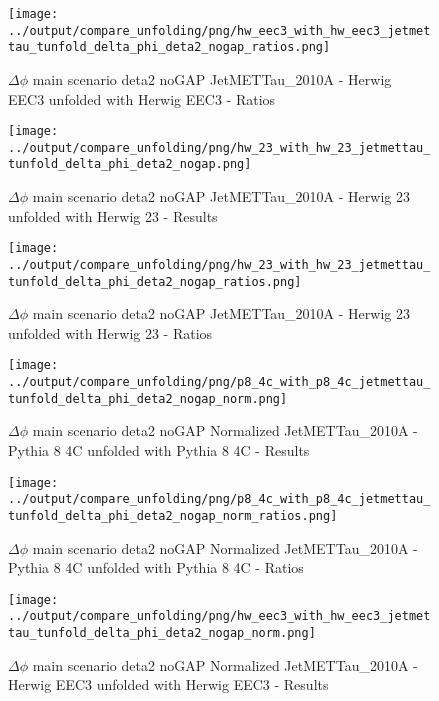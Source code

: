 \documentclass[11pt]{book}
\begin{document}
\begin{figure}[ht]
\centering
\texttt{[image: ../output/compare\_unfolding/png/hw\_eec3\_with\_hw\_eec3\_jetmettau\_tunfold\_delta\_phi\_deta2\_nogap\_ratios.png]}
\caption{$\Delta\phi$ main scenario deta2 noGAP JetMETTau\_2010A - Herwig EEC3 unfolded with Herwig EEC3 - Ratios}
\label{hw_eec3_hw_eec3_jetmettau_tunfold_delta_phi_deta2_nogap_b}
\end{figure}

\begin{figure}[ht]
\centering
\texttt{[image: ../output/compare\_unfolding/png/hw\_23\_with\_hw\_23\_jetmettau\_tunfold\_delta\_phi\_deta2\_nogap.png]}
\caption{$\Delta\phi$ main scenario deta2 noGAP JetMETTau\_2010A - Herwig 23 unfolded with Herwig 23 - Results}
\label{hw_23_hw_23_jetmettau_tunfold_delta_phi_deta2_nogap_a}
\end{figure}

\begin{figure}[ht]
\centering
\texttt{[image: ../output/compare\_unfolding/png/hw\_23\_with\_hw\_23\_jetmettau\_tunfold\_delta\_phi\_deta2\_nogap\_ratios.png]}
\caption{$\Delta\phi$ main scenario deta2 noGAP JetMETTau\_2010A - Herwig 23 unfolded with Herwig 23 - Ratios}
\label{hw_23_hw_23_jetmettau_tunfold_delta_phi_deta2_nogap_b}
\end{figure}


\begin{figure}[ht]
\centering
\texttt{[image: ../output/compare\_unfolding/png/p8\_4c\_with\_p8\_4c\_jetmettau\_tunfold\_delta\_phi\_deta2\_nogap\_norm.png]}
\caption{$\Delta\phi$ main scenario deta2 noGAP Normalized JetMETTau\_2010A - Pythia 8 4C unfolded with Pythia 8 4C - Results}
\label{p8_p8_jetmettau_tunfold_delta_phi_deta2_nogap_norm_a}
\end{figure}

\begin{figure}[ht]
\centering
\texttt{[image: ../output/compare\_unfolding/png/p8\_4c\_with\_p8\_4c\_jetmettau\_tunfold\_delta\_phi\_deta2\_nogap\_norm\_ratios.png]}
\caption{$\Delta\phi$ main scenario deta2 noGAP Normalized JetMETTau\_2010A - Pythia 8 4C unfolded with Pythia 8 4C - Ratios}
\label{p8_p8_jetmettau_tunfold_delta_phi_deta2_nogap_norm_b}
\end{figure}

\begin{figure}[ht]
\centering
\texttt{[image: ../output/compare\_unfolding/png/hw\_eec3\_with\_hw\_eec3\_jetmettau\_tunfold\_delta\_phi\_deta2\_nogap\_norm.png]}
\caption{$\Delta\phi$ main scenario deta2 noGAP Normalized JetMETTau\_2010A - Herwig EEC3 unfolded with Herwig EEC3 - Results}
\label{hw_eec3_hw_eec3_jetmettau_tunfold_delta_phi_deta2_nogap_norm_a}
\end{figure}
\end{document}
